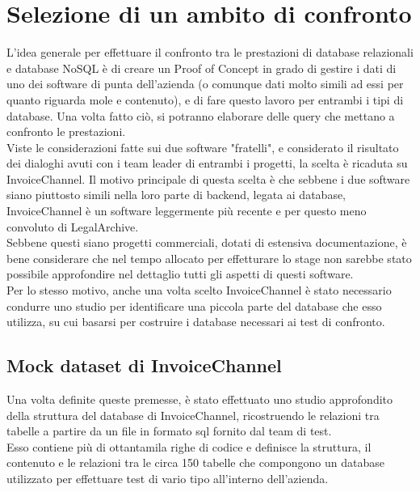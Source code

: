 \section{Selezione di un ambito di confronto}
L'idea generale per effettuare il confronto tra le prestazioni di database relazionali e database NoSQL è di creare un Proof of Concept in grado di gestire i dati di uno dei software di punta dell'azienda (o comunque dati molto simili ad essi per quanto riguarda mole e contenuto), e di fare questo lavoro per entrambi i tipi di database. Una volta fatto ciò, si potranno elaborare delle query che mettano a confronto le prestazioni.\\

\noindent Viste le considerazioni fatte sui due software "fratelli", e considerato il risultato dei dialoghi avuti con i team leader di entrambi i progetti, la scelta è ricaduta su InvoiceChannel. Il motivo principale di questa scelta è che sebbene i due software siano piuttosto simili nella loro parte di backend, legata ai database, InvoiceChannel è un software leggermente più recente e per questo meno convoluto di LegalArchive.\\
Sebbene questi siano progetti commerciali, dotati di estensiva documentazione, è bene considerare che nel tempo allocato per effetturare lo stage non sarebbe stato possibile approfondire nel dettaglio tutti gli aspetti di questi software.\\
Per lo stesso motivo, anche una volta scelto InvoiceChannel è stato necessario condurre uno studio per identificare una piccola parte del database che esso utilizza, su cui basarsi per costruire i database necessari ai test di confronto.\\

\subsection{Mock dataset di InvoiceChannel}
Una volta definite queste premesse, è stato effettuato uno studio approfondito della struttura del database di InvoiceChannel, ricostruendo le relazioni tra tabelle a partire da un file in formato sql fornito dal team di test.\\
Esso contiene più di ottantamila righe di codice e definisce la struttura, il contenuto e le relazioni tra le circa 150 tabelle che compongono un database utilizzato per effettuare test di vario tipo all'interno dell'azienda.\\

